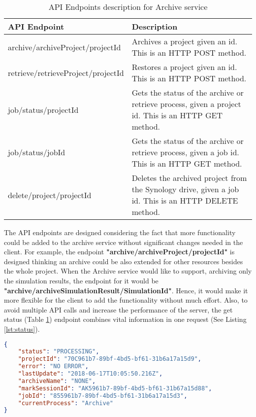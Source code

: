     \begin{table}[H]
        \centering
        \begin{tabular}{|p{6cm}|p{8cm}|}
            \hline
                \textbf{API Endpoint}&\textbf{Description}\\
            \hline
                archive/archiveProject/{{projectId}} & Archives a project given an id. This is an HTTP POST method.\\
            \hline
                retrieve/retrieveProject/{{projectId}} & Restores a project given an id. This is an HTTP POST method.\\
            \hline
                job/status/{{projectId}} & Gets the status of the archive or retrieve process, given a project id. This is an HTTP GET method.\\
            \hline
                job/status/{{jobId}} & Gets the status of the archive or retrieve process, given a job id. This is an HTTP GET method.\\
            \hline
                delete/project/{{projectId}} & Deletes the archived project from the Synology drive, given a job id. This is an HTTP DELETE method.\\
            \hline
        \end{tabular}
        \caption{API Endpoints description for Archive service}
        \label{table:archiveEndpoints}     
    \end{table}  

    The API endpoints are designed considering the fact that more functionality could be added to the archive service without significant changes needed in the client. 
    For example, the endpoint \textbf{"archive/archiveProject/{{projectId}}"} is designed thinking an archive could be also extended for other resources besides the whole project. When
    the Archive service would like to support, archiving only the simulation results, the endpoint for it would be \textbf{"archive/archiveSimulationResult/{{SimulationId}}"}.
    Hence, it would make it more flexible for the client to add the functionality without much effort. Also, to avoid multiple API calls and
    increase the performance of the server, the get status (Table \ref{table:archiveEndpoints}) endpoint combines vital information in one 
    request (See Listing \ref{lst:status}). 
    
\begin{lstlisting}[caption={Successful GET request for an archive status}, language=json,firstnumber=1, captionpos=b, label={lst:status}]
{
    "status": "PROCESSING",
    "projectId": "70C961b7-89bf-4bd5-bf61-31b6a17a15d9",
    "error": "NO ERROR",
    "lastUpdate": "2018-06-17T10:05:50.216Z",
    "archiveName": "NONE",
    "markSessionId": "AK5961b7-89bf-4bd5-bf61-31b67a15d88",
    "jobId": "855961b7-89bf-4bd5-bf61-31b6a17a15d3",
    "currentProcess": "Archive"
}
\end{lstlisting}







    
